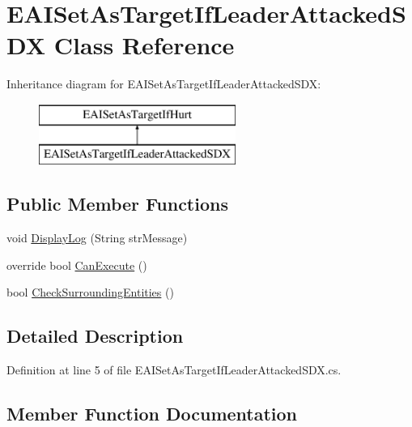 \hypertarget{class_e_a_i_set_as_target_if_leader_attacked_s_d_x}{}\section{E\+A\+I\+Set\+As\+Target\+If\+Leader\+Attacked\+S\+DX Class Reference}
\label{class_e_a_i_set_as_target_if_leader_attacked_s_d_x}
Inheritance diagram for E\+A\+I\+Set\+As\+Target\+If\+Leader\+Attacked\+S\+DX\+:\begin{figure}[H]
\begin{center}
\leavevmode
\includegraphics[height=2.000000cm]{d3/d4f/class_e_a_i_set_as_target_if_leader_attacked_s_d_x}
\end{center}
\end{figure}
\subsection*{Public Member Functions}
\begin{DoxyCompactItemize}
\item 
void \mbox{\hyperlink{class_e_a_i_set_as_target_if_leader_attacked_s_d_x_ac6971e678bcccd43ead16491145e3c4b}{Display\+Log}} (String str\+Message)
\item 
override bool \mbox{\hyperlink{class_e_a_i_set_as_target_if_leader_attacked_s_d_x_a41a5de3f7eaca129bbfadb0e84375494}{Can\+Execute}} ()
\item 
bool \mbox{\hyperlink{class_e_a_i_set_as_target_if_leader_attacked_s_d_x_a69887bc9691491549b640e9aa4bb00bd}{Check\+Surrounding\+Entities}} ()
\end{DoxyCompactItemize}


\subsection{Detailed Description}


Definition at line 5 of file E\+A\+I\+Set\+As\+Target\+If\+Leader\+Attacked\+S\+D\+X.\+cs.



\subsection{Member Function Documentation}
\mbox{\label{class_e_a_i_set_as_target_if_leader_attacked_s_d_x_a41a5de3f7eaca129bbfadb0e84375494}} 
